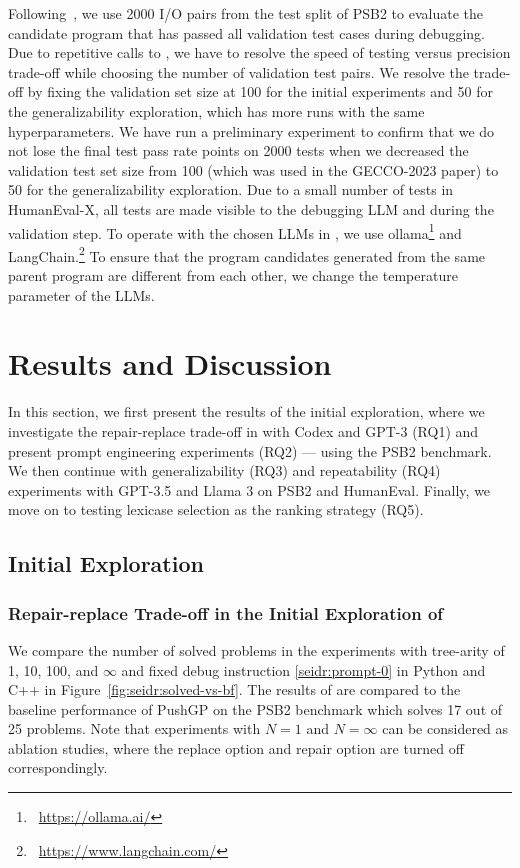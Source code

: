 Following~\citet{helmuth2021:psb2}, we use 2000 I/O pairs from the test split of PSB2 to evaluate the candidate program that has passed all validation test cases during debugging. 
Due to repetitive calls to \execute{}, we have to resolve the speed of testing versus precision trade-off while choosing the number of validation test pairs.
We resolve the trade-off by fixing the validation set size at 100 for the initial experiments and 50 for the generalizability exploration, which has more runs with the same hyperparameters. 
We have run a preliminary experiment to confirm that we do not lose the final test pass rate points on 2000 tests when we decreased the validation test set size from 100 (which was used in the GECCO-2023 paper) to 50 for the generalizability exploration.
Due to a small number of tests in HumanEval-X, all tests are made visible to the debugging LLM and during the validation step.  
To operate with the chosen LLMs in \method{}, we use ollama\footnote{~\url{https://ollama.ai/}} and LangChain.\footnote{~\url{https://www.langchain.com/}}  
To ensure that the program candidates generated from the same parent program are different from each other, we change the temperature parameter of the LLMs. 
 

\section{Results and Discussion}
\label{sec:seidr-results}

In this section, we first present the results of the initial exploration, where we investigate the repair-replace trade-off in \method{} with Codex and GPT-3 (RQ1) and present prompt engineering experiments (RQ2) --- using the PSB2 benchmark.
We then continue with generalizability (RQ3) and repeatability (RQ4) experiments with GPT-3.5 and Llama 3 on PSB2 and HumanEval.
Finally, we move on to testing lexicase selection as the ranking strategy (RQ5).

\subsection{Initial Exploration}

\subsubsection{Repair-replace Trade-off in the Initial Exploration of \method{}}
\label{sec:seidr-seidr:rq1}
We compare the number of solved problems in the experiments with tree-arity of 1, 10, 100, and $\infty$ and fixed debug instruction \ref{seidr:prompt-0} in Python and C++ in Figure~\ref{fig:seidr:solved-vs-bf}. 
The results of \method{} are compared to the baseline performance of PushGP on the PSB2 benchmark which solves 17 out of 25 problems. 
Note that experiments with $N=1$ and $N=\infty$ can be considered as ablation studies, where the replace option and repair option are turned off correspondingly. 

